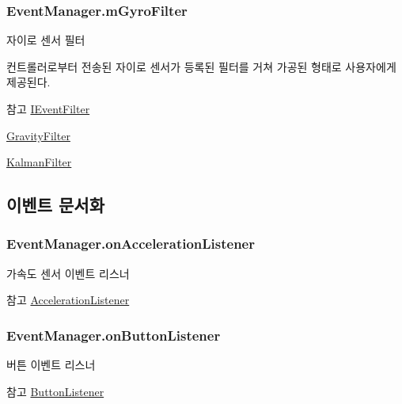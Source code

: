 \subsubsection[{m\+Gyro\+Filter}]{ Event\+Manager.\+m\+Gyro\+Filter}\label{class_event_manager_a7cee85488f5d7220c102cd945b1f494a}
자이로 센서 필터

컨트롤러로부터 전송된 자이로 센서가 등록된 필터를 거쳐 가공된 형태로 사용자에게 제공된다. \begin{DoxySeeAlso}{참고}
\hyperlink{interface_i_event_filter}{I\+Event\+Filter} 

\hyperlink{class_gravity_filter}{Gravity\+Filter} 

\hyperlink{class_kalman_filter}{Kalman\+Filter} 
\end{DoxySeeAlso}


\subsection{이벤트 문서화}
\hypertarget{class_event_manager_a653a885d332bd10bf53a1f8e6a8c36cd}{}
\subsubsection[{on\+Acceleration\+Listener}]{ Event\+Manager.\+on\+Acceleration\+Listener}\label{class_event_manager_a653a885d332bd10bf53a1f8e6a8c36cd}
가속도 센서 이벤트 리스너 \begin{DoxySeeAlso}{참고}
\hyperlink{class_event_manager_ac459bcb4ba4f140243e271628f8d366c}{Acceleration\+Listener} 
\end{DoxySeeAlso}
\hypertarget{class_event_manager_a6f4d5e2ed1262c99f3295743878ba681}{}
\subsubsection[{on\+Button\+Listener}]{ Event\+Manager.\+on\+Button\+Listener}\label{class_event_manager_a6f4d5e2ed1262c99f3295743878ba681}
버튼 이벤트 리스너 \begin{DoxySeeAlso}{참고}
\hyperlink{class_event_manager_ae17715b9a94a50d9a8e1f29580af7c16}{Button\+Listener} 
\end{DoxySeeAlso}
\hypertarget{class_event_manager_af12f0caee161b1b2222cfd13cd957750}{}
